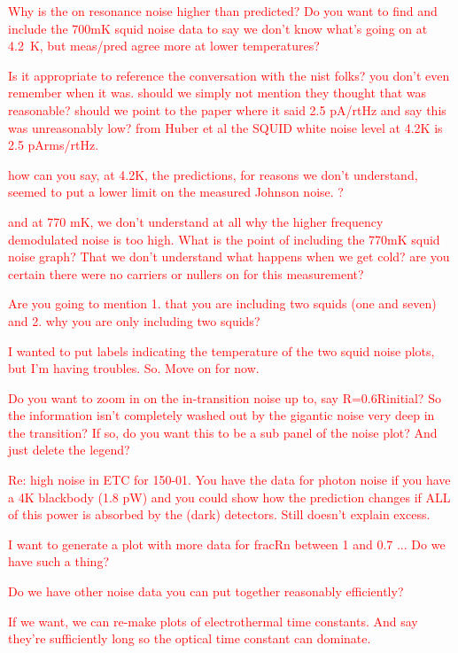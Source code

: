 \textcolor{red}{Why is the on resonance noise higher than predicted? Do you want to find and include the 700mK squid noise data to say we don't know what's going on at 4.2~K, but meas/pred agree more at lower temperatures?}

\textcolor{red}{Is it appropriate to reference the conversation with the nist folks? you don't even remember when it was. should we simply not mention they thought that was reasonable? should we point to the paper where it said 2.5 pA/rtHz and say this was unreasonably low? from Huber et al the SQUID white noise level at 4.2K is 2.5 pArms/rtHz.}

\textcolor{red}{how can you say, at 4.2K, the predictions, for reasons we don't understand, seemed to put a lower limit on the measured Johnson noise. ?}

\textcolor{red}{and at 770 mK, we don't understand at all why the higher frequency demodulated noise is too high. What is the point of including the 770mK squid noise graph? That we don't understand what happens when we get cold? are you certain there were no carriers or nullers on for this measurement?}

\textcolor{red}{Are you going to mention 1. that you are including two squids (one and seven) and 2. why you are only including two squids?}

\textcolor{red}{I wanted to put labels indicating the temperature of the two squid noise plots, but I'm having troubles. So. Move on for now.}

\textcolor{red}{Do you want to zoom in on the in-transition noise up to, say R=0.6Rinitial? So the information isn't completely washed out by the gigantic noise very deep in the transition? If so, do you want this to be a sub panel of the noise plot? And just delete the legend?}

\textcolor{red}{Re: high noise in ETC for 150-01. You have the data for photon noise if you have a 4K blackbody (1.8 pW) and you could show how the prediction changes if ALL of this power is absorbed by the (dark) detectors. Still doesn't explain excess.}

\textcolor{red}{I want to generate a plot with more data for fracRn between 1 and 0.7 ... Do we have such a thing?}

\textcolor{red}{Do we have other noise data you can put together reasonably efficiently?}

\textcolor{red}{If we want, we can re-make plots of electrothermal time constants. And say they're sufficiently long so the optical time constant can dominate.}

